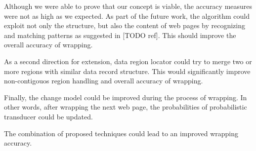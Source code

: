 Although we were able to prove that our concept is viable, the accuracy measures were not as high as we expected. As part of the future work, the algorithm could exploit not only the structure, but also the content of web pages by recognizing and matching patterns as suggested in [TODO ref]. This should improve the overall accuracy of wrapping.

As a second direction for extension, data region locator could try to merge two or more regions with similar data record structure. This would significantly improve non-contigouos region handling and overall accuracy of wrapping.

Finally, the change model could be improved during the process of wrapping. In other words, after wrapping the next web page, the probabilities of probabilistic transducer could be updated.

The combination of proposed techniques could lead to an improved wrapping accuracy.


